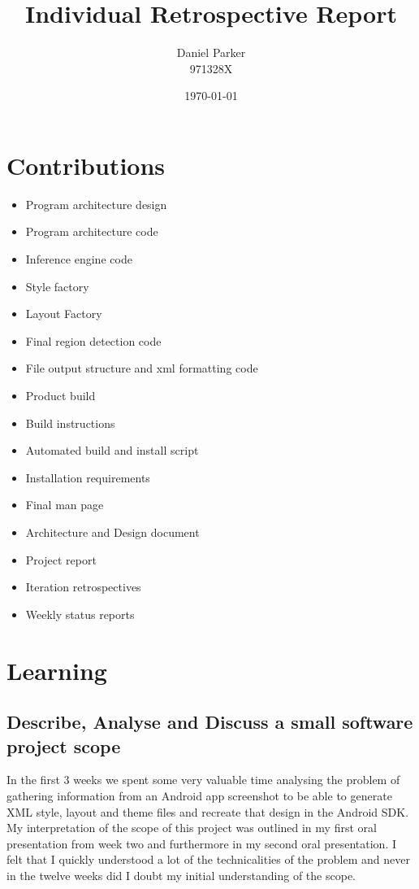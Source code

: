 \documentclass{article}
\title{Individual Retrospective Report}
\author{Daniel Parker \\ 971328X}
\date{\today}
\begin{document}
\maketitle

\section{Contributions}
\begin{itemize}
	\item{Program architecture design}
	\item{Program architecture code}
	\item{Inference engine code}
	\item{Style factory}
	\item{Layout Factory}
	\item{Final region detection code}
	\item{File output structure and xml formatting code}
	\item{Product build}
	\item{Build instructions}
	\item{Automated build and install script}
	\item{Installation requirements}
	\item{Final man page}
	\item{Architecture and Design document}
	\item{Project report}
	\item{Iteration retrospectives}
	\item{Weekly status reports}
\end{itemize}

\maketitle
\section{Learning}
\subsection{Describe, Analyse and Discuss a small software project scope}
In the first 3 weeks we spent some very valuable time analysing the problem of gathering information from an Android app screenshot to be able to generate XML style, layout and theme files and recreate that design in the Android SDK. My interpretation of the scope of this project was outlined in my first oral presentation from week two and furthermore in my second oral presentation. I felt that I quickly understood a lot of the technicalities of the problem and never in the twelve weeks did I doubt my initial understanding of the scope.
\end{document}
